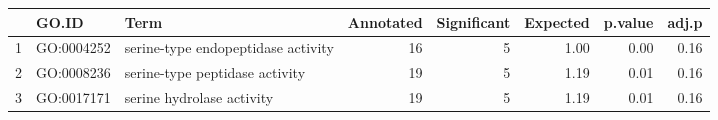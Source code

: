\begin{table}[ht]
\centering
\begin{tabular}{rllrrrrr}
  \hline
 & GO.ID & Term & Annotated & Significant & Expected & p.value & adj.p \\ 
  \hline
1 & GO:0004252 & serine-type endopeptidase activity &  16 &   5 & 1.00 & 0.00 & 0.16 \\ 
  2 & GO:0008236 & serine-type peptidase activity &  19 &   5 & 1.19 & 0.01 & 0.16 \\ 
  3 & GO:0017171 & serine hydrolase activity &  19 &   5 & 1.19 & 0.01 & 0.16 \\ 
   \hline
\end{tabular}
\end{table}
